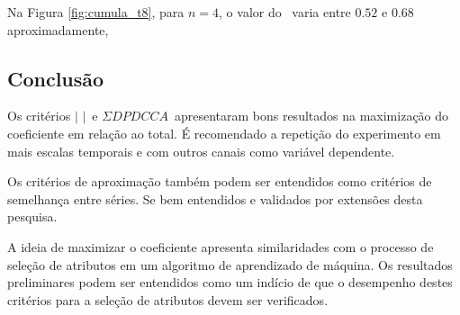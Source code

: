 Na Figura \ref{fig:cumula_t8}, para $n = 4$, o valor do \dmc~varia entre $0.52$ e $0.68$ aproximadamente, 
 

\subsection{Conclusão}

Os critérios $|$ \pdcca $|$~e $\Sigma DPDCCA$~apresentaram bons resultados na maximização do coeficiente \dmc em relação ao total. É recomendado a repetição do experimento em mais escalas temporais e com outros canais como variável dependente.

Os critérios de aproximação também podem ser entendidos como critérios de semelhança entre séries. Se bem entendidos e validados por extensões desta pesquisa.

A ideia de maximizar o coeficiente apresenta similaridades com o processo de seleção de atributos em um algoritmo de aprendizado de máquina. Os resultados preliminares podem ser entendidos como um indício de que o desempenho destes critérios para a seleção de atributos devem ser verificados.